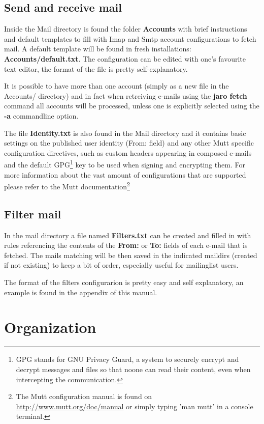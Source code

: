 \documentclass[a4,onecolumn,portrait]{article}
\begin{document}
\subsection{Send and receive mail}
\label{sec-4-1}

Inside the Mail directory is found the folder \textbf{Accounts} with brief
instructions and default templates to fill with Imap and Smtp account
configurations to fetch mail. A default template will be found in
fresh installations: \textbf{Accounts/default.txt}. The configuration can
be edited with one's favourite text editor, the format of the file
is pretty self-explanatory.

It is possible to have more than one account (simply as a new file
in the Accounts/ directory) and in fact when retreiving e-mails
using the \textbf{jaro fetch} command all accounts will be processed,
unless one is explicitly selected using the \textbf{-a} commandline
option.

The file \textbf{Identity.txt} is also found in the Mail directory and it
contains basic settings on the published user identity (From:
field) and any other Mutt specific configuration directives, such
as custom headers appearing in composed e-mails and the default
GPG\footnote{GPG stands for GNU Privacy Guard, a system to securely
encrypt and decrypt messages and files so that noone can read their
content, even when intercepting the communication.} key to be used when signing and encrypting them.  For
more information about the vast amount of configurations that are
supported please refer to the Mutt documentation\footnote{The Mutt configuration manual is found on \url{http://www.mutt.org/doc/manual} or simply typing 'man mutt' in a console terminal.}
\subsection{Filter mail}
\label{sec-4-2}

In the mail directory a file named \textbf{Filters.txt} can be created and
filled in with rules referencing the contents of the \textbf{From:}
or \textbf{To:} fields of each e-mail that is fetched. The mails matching
will be then saved in the indicated maildirs (created if not
existing) to keep a bit of order, especially useful for mailinglist
users.

The format of the filters configurarion is pretty easy and self
explanatory, an example is found in the appendix of this manual.

\section{Organization}
\label{sec-5}
\end{document}
